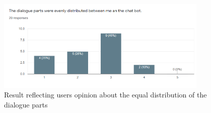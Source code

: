 \begin{figure}[!h]
    \centering
    \includegraphics[width=0.9\textwidth]{img/Even_Parts.PNG}
    \caption{Result reflecting users opinion about the equal distribution of the dialogue parts}
    \label{fig:evenDist}
\end{figure}

